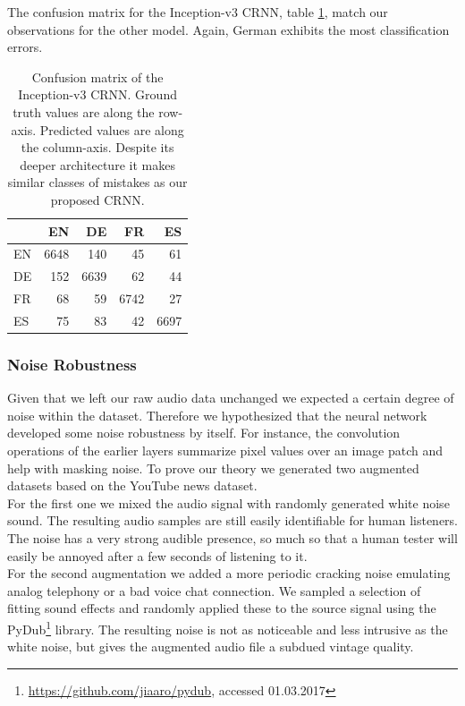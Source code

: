	The confusion matrix for the Inception-v3 CRNN, table \ref{tab:language_family_inception}, match our observations for the other model. Again, German exhibits the most classification errors. 
	
	\begin{table}[]
	\centering
	\begin{tabularx}{\textwidth}{l|rrrr}
	      & EN     & DE     & FR     & ES \\ \midrule
	  EN  & \cellcolor{lightgray} 6648   & 140    & 45     & 61 \\
	  DE  & 152    & \cellcolor{lightgray} 6639   & 62     & 44 \\
	  FR  & 68     & 59     & \cellcolor{lightgray} 6742   & 27 \\
	  ES  & 75     & 83     & 42     & \cellcolor{lightgray} 6697 \\
	\end{tabularx}
	\caption{Confusion matrix of the Inception-v3 CRNN. Ground truth values are along the row-axis. Predicted values are along the column-axis. Despite its deeper architecture it makes similar classes of mistakes as our proposed CRNN. }
	\label{tab:language_family_inception}
	\end{table}
 

\subsubsection{Noise Robustness} 
\label{sec:noise_robustness}
Given that we left our raw audio data unchanged we expected a certain degree of noise within the dataset. Therefore we hypothesized that the neural network developed some noise robustness by itself. For instance, the convolution operations of the earlier layers summarize pixel values over an image patch and help with masking noise. To prove our theory we generated two augmented datasets based on the YouTube news dataset.\\ 
For the first one we mixed the audio signal with randomly generated white noise sound. The resulting audio samples are still easily identifiable for human listeners. The noise has a very strong audible presence, so much so that a human tester will easily be annoyed after a few seconds of listening to it.\\
For the second augmentation we added a more periodic cracking noise emulating analog telephony or a bad voice chat connection. We sampled a selection of fitting sound effects and randomly applied these to the source signal using the PyDub\footnote{\url{https://github.com/jiaaro/pydub}, accessed 01.03.2017} library. The resulting noise is not as noticeable and less intrusive as the white noise, but gives the augmented audio file a subdued vintage quality.

